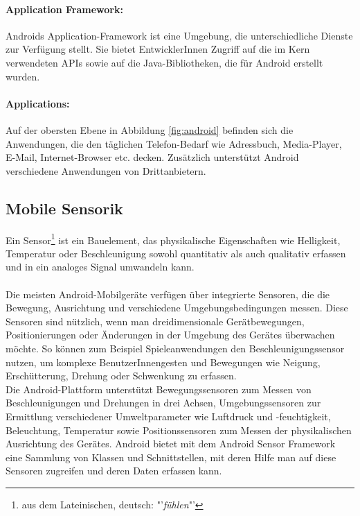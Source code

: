 \paragraph{Application Framework: }
Androids Application-Framework ist eine Umgebung, die unterschiedliche Dienste zur Verfügung stellt. Sie bietet EntwicklerInnen Zugriff auf die im Kern verwendeten \glspl{API} sowie auf die Java-Bibliotheken, die für Android erstellt wurden. 
\paragraph{Applications: }
Auf der obersten Ebene in Abbildung \ref{fig:android} befinden sich die Anwendungen, die den täglichen Telefon-Bedarf wie Adressbuch, Media-Player, E-Mail, Internet-Browser etc. decken. Zusätzlich unterstützt Android verschiedene Anwendungen von Drittanbietern.
%
%
\subsection{Mobile Sensorik} 
Ein Sensor\footnote{ aus dem Lateinischen, deutsch: "'\textit{fühlen}"'} ist ein Bauelement, das physikalische Eigenschaften wie Helligkeit, Temperatur oder Beschleunigung sowohl quantitativ als auch qualitativ erfassen und in ein analoges Signal umwandeln kann. \cite{sensor} \\\\
Die meisten Android-Mobilgeräte verfügen über integrierte Sensoren, die die Bewegung, Ausrichtung und verschiedene Umgebungsbedingungen messen. Diese Sensoren sind nützlich, wenn man dreidimensionale Gerätbewegungen, Positionierungen oder Änderungen in der Umgebung des Gerätes überwachen möchte. So können zum Beispiel Spieleanwendungen den Beschleunigungssensor nutzen, um komplexe BenutzerInnengesten und Bewegungen wie Neigung, Erschütterung, Drehung oder Schwenkung zu erfassen.\\
Die Android-Plattform unterstützt Bewegungssensoren zum Messen von Beschleunigungen und Drehungen in drei Achsen, Umgebungssensoren zur Ermittlung verschiedener Umweltparameter wie Luftdruck und -feuchtigkeit, Beleuchtung, Temperatur sowie Positionssensoren zum Messen der physikalischen Ausrichtung des Gerätes. Android bietet mit dem Android Sensor Framework eine Sammlung von Klassen und Schnittstellen, mit deren Hilfe man auf diese Sensoren zugreifen und deren Daten erfassen kann. \cite{android_sensor}  
%
%
